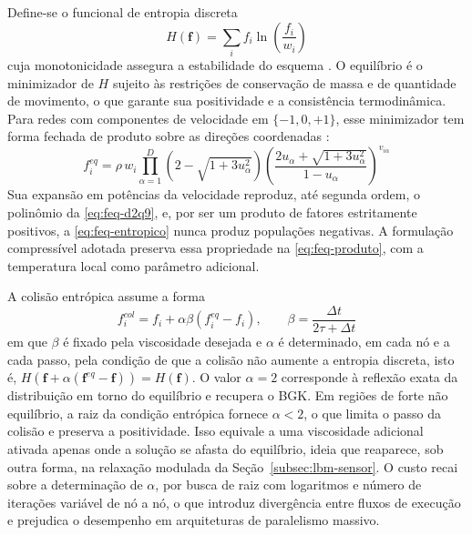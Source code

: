 Define-se o funcional de entropia discreta
\begin{equation}\label{eq:funcional-h}
    H(\mathbf{f}) = \sum_i f_i \ln \left( \frac{f_i}{w_i} \right)
\end{equation}
cuja monotonicidade assegura a estabilidade do esquema \parencite{Karlin1999}.
O equilíbrio é o minimizador de $H$ sujeito às restrições de conservação de massa e de quantidade de movimento, o que garante sua positividade e a consistência termodinâmica.
Para redes com componentes de velocidade em $\{-1, 0, +1\}$, esse minimizador tem forma fechada de produto sobre as direções coordenadas \parencite{Ansumali2002}:
\begin{equation}\label{eq:feq-entropico}
    f_i^{eq} = \rho\, w_i \prod_{\alpha=1}^{D} \left( 2 - \sqrt{1 + 3 u_\alpha^2} \right) \left( \frac{2 u_\alpha + \sqrt{1 + 3 u_\alpha^2}}{1 - u_\alpha} \right)^{v_{i\alpha}}
\end{equation}
Sua expansão em potências da velocidade reproduz, até segunda ordem, o polinômio da \eqref{eq:feq-d2q9}, e, por ser um produto de fatores estritamente positivos, a \eqref{eq:feq-entropico} nunca produz populações negativas.
A formulação compressível adotada preserva essa propriedade na \eqref{eq:feq-produto}, com a temperatura local como parâmetro adicional.

A colisão entrópica assume a forma
\begin{equation}\label{eq:colisao-entropica}
    f_i^{col} = f_i + \alpha \beta \left( f_i^{eq} - f_i \right), \qquad \beta = \frac{\Delta t}{2\tau + \Delta t}
\end{equation}
em que $\beta$ é fixado pela viscosidade desejada e $\alpha$ é determinado, em cada nó e a cada passo, pela condição de que a colisão não aumente a entropia discreta, isto é, $H(\mathbf{f} + \alpha (\mathbf{f}^{eq} - \mathbf{f})) = H(\mathbf{f})$.
O valor $\alpha = 2$ corresponde à reflexão exata da distribuição em torno do equilíbrio e recupera o BGK.
Em regiões de forte não equilíbrio, a raiz da condição entrópica fornece $\alpha < 2$, o que limita o passo da colisão e preserva a positividade.
Isso equivale a uma viscosidade adicional ativada apenas onde a solução se afasta do equilíbrio, ideia que reaparece, sob outra forma, na relaxação modulada da Seção~\ref{subsec:lbm-sensor}.
O custo recai sobre a determinação de $\alpha$, por busca de raiz com logaritmos e número de iterações variável de nó a nó, o que introduz divergência entre fluxos de execução e prejudica o desempenho em arquiteturas de paralelismo massivo.

